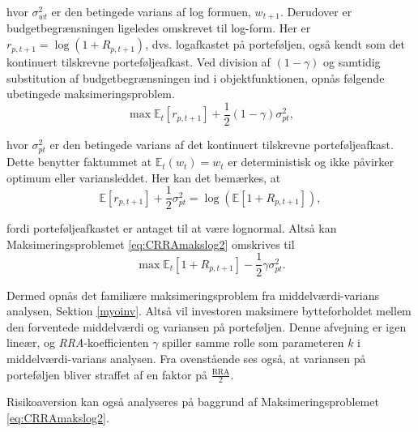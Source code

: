 \documentclass[
  a4paper,
  oneside]{memoir}
\begin{document}
hvor \(\sigma_{wt}^2\) er den betingede varians af log formuen, \(w_{t+1}\). Derudover er budgetbegrænsningen ligeledes omskrevet til log-form. Her er \(r_{p,t+1}=\log(1+R_{p,t+1})\), dvs. logafkastet på porteføljen, også kendt som det kontinuert tilskrevne porteføljeafkast. Ved division af \((1-\gamma)\) og samtidig substitution af budgetbegrænsningen ind i objektfunktionen, opnås følgende ubetingede maksimeringsproblem.
\begin{equation}
\max\mathbb{E}_t\left[r_{p,t+1}\right] + \frac{1}{2}(1-\gamma)\sigma_{pt}^2, \label{eq:CRRAmakslog2}
\end{equation}

hvor \(\sigma_{pt}^2\) er den betingede varians af det kontinuert tilskrevne porteføljeafkast. Dette benytter faktummet at \(\mathbb{E}_t(w_t)=w_t\) er deterministisk og ikke påvirker optimum eller variansleddet. Her kan det bemærkes, at
\begin{equation}
\mathbb{E}\left[r_{p,t+1}\right]+\frac{1}{2}\sigma_{pt}^2=\log(\mathbb{E}\left[1+R_{p,t+1}\right]), \label{eq:portafkls}
\end{equation}

fordi porteføljeafkastet er antaget til at være lognormal. Altså kan Maksimeringsproblemet \eqref{eq:CRRAmakslog2} omskrives til
\begin{equation}
\max\mathbb{E}_t[1+R_{p,t+1}] - \frac{1}{2}\gamma\sigma_{pt}^2. \label{eq:CRRAmakslog3}
\end{equation}

Dermed opnås det familiære maksimeringsproblem fra middelværdi-varians analysen, Sektion \ref{myoinv}. Altså vil investoren maksimere bytteforholdet mellem den forventede middelværdi og variansen på porteføljen. Denne afvejning er igen lineær, og \emph{RRA}-koefficienten \(\gamma\) spiller samme rolle som parameteren \(k\) i middelværdi-varians analysen. Fra ovenstående ses også, at variansen på porteføljen bliver straffet af en faktor på \(\tfrac{\text{RRA}}{2}\).

Risikoaversion kan også analyseres på baggrund af Maksimeringsproblemet \eqref{eq:CRRAmakslog2}.
\end{document}
